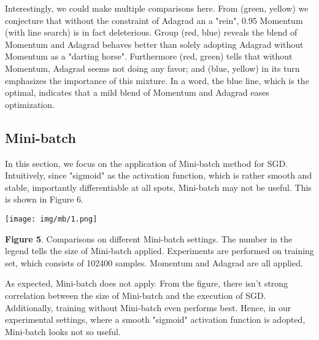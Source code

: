 \documentclass{article} %
\begin{document}
Interestingly, we could make multiple comparisons here. From (green, yellow) we conjecture that without the constraint of Adagrad an a "rein", 0.95 Momentum (with line search) is in fact deleterious. Group (red, blue) reveals the blend of Momentum and Adagrad behaves better than solely adopting Adagrad without Momentum as a "darting horse". Furthermore (red, green) tells that without Momentum, Adagrad seems not doing any favor; and (blue, yellow) in its turn emphasizes the importance of this mixture. In a word, the blue line, which is the optimal, indicates that a mild blend of Momentum and Adagrad eases optimization.

\subsection{Mini-batch}
In this section, we focus on the application of Mini-batch method for SGD. Intuitively, since "sigmoid" as the activation function, which is rather smooth and stable, importantly differentiable at all spots, Mini-batch may not be useful. This is shown in Figure 6.
\begin{center}
\texttt{[image: img/mb/1.png]} 
\end{center}
{\bf Figure 5}. Comparisons on different Mini-batch settings. The number in the legend tells the size of Mini-batch applied. Experiments are performed on training set, which consists of 102400 samples. Momentum and Adagrad are all applied.

As expected, Mini-batch does not apply. From the figure, there isn't strong correlation between the size of Mini-batch and the execution of SGD. Additionally, training without Mini-batch even performs best. Hence, in our experimental settings, where a smooth "sigmoid" activation function is adopted, Mini-batch looks not so useful.
\end{document}
